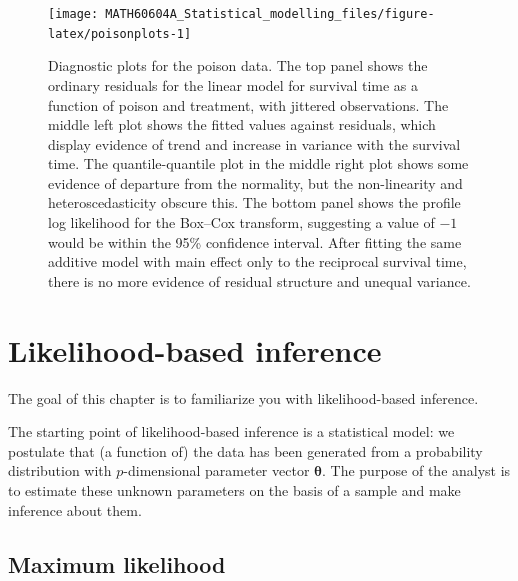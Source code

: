 \documentclass[
  11pt,
  letterpaper,
]{book}
\theoremstyle{definition}
\theoremstyle{definition}
\theoremstyle{definition}
\theoremstyle{remark}
\begin{document}
\begin{figure}

{\centering \texttt{[image: MATH60604A\_Statistical\_modelling\_files/figure-latex/poisonplots-1]} 

}

\caption{Diagnostic plots for the poison data. The top panel shows the ordinary residuals for the linear model for survival time as a function of poison and treatment, with jittered observations. The middle left plot shows the fitted values against residuals, which display evidence of trend and increase in variance with the survival time. The quantile-quantile plot in the middle right plot shows some evidence of departure from the normality, but the non-linearity and heteroscedasticity obscure this. The bottom panel shows the profile log likelihood for the Box--Cox transform, suggesting a value of $-1$ would be within the 95\% confidence interval. After fitting the same additive model with main effect only to the reciprocal survival time, there is no more evidence of residual structure and unequal variance.}\label{fig:poisonplots}
\end{figure}

\hypertarget{likelihood}{%
\chapter{Likelihood-based inference}\label{likelihood}}

The goal of this chapter is to familiarize you with likelihood-based inference.

The starting point of likelihood-based inference is a statistical model: we postulate that (a function of) the data has been generated from a probability distribution with \(p\)-dimensional parameter vector \(\boldsymbol{\theta}\). The purpose of the analyst is to estimate these unknown parameters on the basis of a sample and make inference about them.

\hypertarget{maximum-likelihood}{%
\section{Maximum likelihood}\label{maximum-likelihood}}
\end{document}
